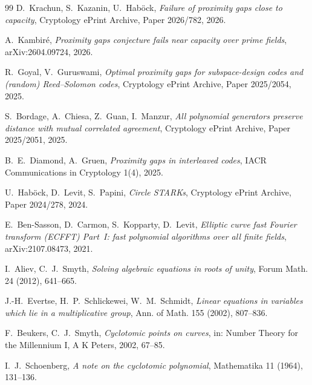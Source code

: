 \documentclass[11pt]{article}
\theoremstyle{definition}
\begin{document}
\begin{thebibliography}{99}
D.~Krachun, S.~Kazanin, U.~Hab\"ock,
\emph{Failure of proximity gaps close to capacity},
Cryptology ePrint Archive, Paper 2026/782, 2026.

A.~Kambir\'e,
\emph{Proximity gaps conjecture fails near capacity over prime fields},
arXiv:2604.09724, 2026.

R.~Goyal, V.~Guruswami,
\emph{Optimal proximity gaps for subspace-design codes and (random) Reed--Solomon codes},
Cryptology ePrint Archive, Paper 2025/2054, 2025.

S.~Bordage, A.~Chiesa, Z.~Guan, I.~Manzur,
\emph{All polynomial generators preserve distance with mutual correlated agreement},
Cryptology ePrint Archive, Paper 2025/2051, 2025.

B.~E.~Diamond, A.~Gruen,
\emph{Proximity gaps in interleaved codes},
IACR Communications in Cryptology 1(4), 2025.

U.~Hab\"ock, D.~Levit, S.~Papini,
\emph{Circle STARKs},
Cryptology ePrint Archive, Paper 2024/278, 2024.

E.~Ben-Sasson, D.~Carmon, S.~Kopparty, D.~Levit,
\emph{Elliptic curve fast Fourier transform (ECFFT) Part~I: fast polynomial algorithms over all finite fields},
arXiv:2107.08473, 2021.

I.~Aliev, C.~J.~Smyth,
\emph{Solving algebraic equations in roots of unity},
Forum Math. 24 (2012), 641--665.

J.-H.~Evertse, H.~P.~Schlickewei, W.~M.~Schmidt,
\emph{Linear equations in variables which lie in a multiplicative group},
Ann. of Math. 155 (2002), 807--836.

F.~Beukers, C.~J.~Smyth,
\emph{Cyclotomic points on curves},
in: Number Theory for the Millennium I, A K Peters, 2002, 67--85.

I.~J.~Schoenberg,
\emph{A note on the cyclotomic polynomial},
Mathematika 11 (1964), 131--136.

\end{thebibliography}
\end{document}
